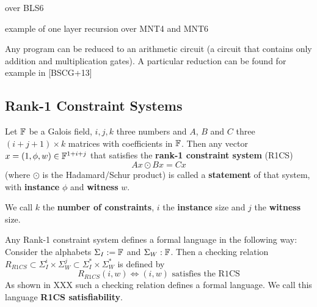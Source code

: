 \begin{example}

\end{example}

\begin{example}
over BLS6
\end{example}

\begin{example}
example of one layer recursion over MNT4 and MNT6
\end{example}


\begin{example}

\end{example}

\begin{example}

\end{example}

Any program  can be reduced to  an arithmetic circuit  (a circuit that contains only addition and multiplication gates). A particular reduction can be found for example in [BSCG+13]



\subsection{Rank-1 Constraint Systems}

\begin{definition}
Let $\mathbb{F}$ be a Galois field, $i,j,k$ three numbers and $A$, $B$ and $C$ three $(i+j+1) \times k$ matrices with coefficients in $\mathbb{F}$. Then any vector $x= (1,\phi,w)\in \mathbb{F}^{1+i+j}$ that satisfies the \textbf{rank-1 constraint system} (R1CS)
$$
Ax \odot Bx = Cx
$$
(where $\odot$ is the Hadamard/Schur product) is called a \textbf{statement} of that system, with \textbf{instance} $\phi$ and \textbf{witness} $w$.

We call $k$ the \textbf{number of constraints}, $i$ the \textbf{instance} size and $j$ the \textbf{witness} size.
\end{definition}

\begin{remark} Any Rank-1 constraint system defines a formal language in the following way: Consider the alphabets $\Sigma_I:= \mathbb{F}$ and $\Sigma_W:\mathbb{F}$. Then a checking relation $R_{R1CS} \subset \Sigma_I^i \times \Sigma_W^j \subset \Sigma_I^* \times \Sigma_W^*$ is defined by 
$$
R_{R1CS}(i,w) \Leftrightarrow (i,w)\text{ satisfies the R1CS}
$$
As shown in XXX such a checking relation defines a formal language. We call this language \textbf{R1CS satisfiability}.
\end{remark}

